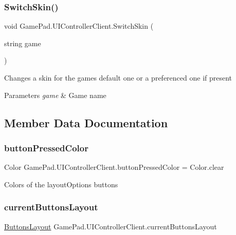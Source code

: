 \subsubsection{\texorpdfstring{SwitchSkin()}{SwitchSkin()}}
{\footnotesize\ttfamily void Game\+Pad.\+U\+I\+Controller\+Client.\+Switch\+Skin (\begin{DoxyParamCaption}\item[{string}]{game }\end{DoxyParamCaption})}



Changes a skin for the game\textquotesingle{}s default one or a preferenced one if present 


\begin{DoxyParams}{Parameters}
{\em game} & Game name\\
\hline
\end{DoxyParams}


\subsection{Member Data Documentation}
\mbox{\label{class_game_pad_1_1_u_i_controller_client_a4877c17daea5bc7cbbc1e6138cd528c1}} 
\subsubsection{\texorpdfstring{buttonPressedColor}{buttonPressedColor}}
{\footnotesize\ttfamily Color Game\+Pad.\+U\+I\+Controller\+Client.\+button\+Pressed\+Color = Color.\+clear}



Colors of the layout\+Options buttons 

\mbox{\label{class_game_pad_1_1_u_i_controller_client_a2d73e4e59d892e4af36dc174b24eebef}} 
\subsubsection{\texorpdfstring{currentButtonsLayout}{currentButtonsLayout}}
{\footnotesize\ttfamily \mbox{\hyperlink{class_game_pad_1_1_buttons_layout}{Buttons\+Layout}} Game\+Pad.\+U\+I\+Controller\+Client.\+current\+Buttons\+Layout}



